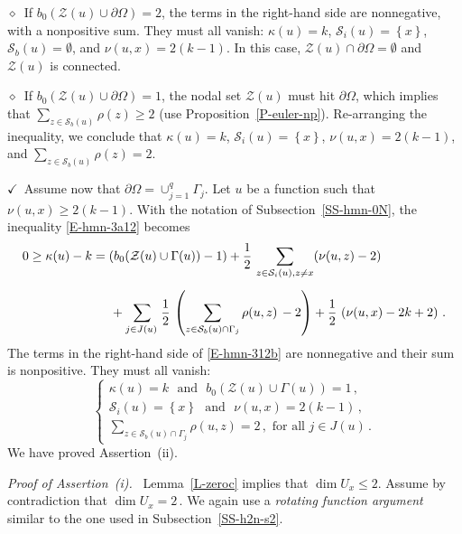 \documentclass[12pt,a4paper]{amsart}
\theoremstyle{plain} %
\theoremstyle{definition}
\numberwithin{equation}{section}
\numberwithin{figure}{section}
\numberwithin{table}{section}
\newcommand{\cS}{\mathcal{S}}
\newcommand{\cZ}{\mathcal{Z}}
\newcommand{\set}[1]{\left\lbrace #1 \right\rbrace}
\newcommand{\noid}{\noindent $\diamond$~}
\newcommand{\noih}{\noindent $\checkmark$~}
\begin{document}
\noid If $b_0(\cZ(u)\cup \partial\Omega) = 2$, the terms in the right-hand side are nonnegative, with a nonpositive sum. They must all vanish: $\kappa(u) = k$, $\cS_i(u) = \set{x}$, $\cS_b(u) = \emptyset$, and $\nu(u,x) = 2(k - 1)$. In this case, $\cZ(u) \cap \partial \Omega = \emptyset$ and $\cZ(u)$ is connected. \smallskip

\noid If $b_0(\cZ(u)\cup \partial\Omega) = 1$, the nodal set $\cZ(u)$ must hit $\partial \Omega$, which implies that $\sum_{z\in \cS_b(u) }\rho (z) \ge 2$ (use Proposition~\ref{P-euler-np}). Re-arranging the inequality, we conclude that $\kappa(u) = k$, $\cS_i(u) = \set{x}$, $\nu(u,x) = 2(k - 1)$, and $\sum_{z\in \cS_b(u) }\rho (z) = 2$. \medskip

\noih Assume now that $\partial \Omega = \cup_{j=1}^q \Gamma_j$. Let $u$ be a function such that $\nu(u,x) \ge 2(k - 1)$. With the notation of  Subsection~\ref{SS-hmn-0N}, the inequality \eqref{E-hmn-3a12} becomes
%
\begin{equation}\label{E-hmn-312b}
\begin{split}
0 \ge \kappa(u) - k &= \left( b_0(\cZ(u) \cup \Gamma(u)) - 1\right) + \frac 12\, \sum_{z \in \cS_i(u), z\not = x}(\nu(u,z) - 2) \\[5pt]
&\hspace{5mm} + \sum_{j \in J(u)\,}  \frac 12\,  \left(\sum_{z\in \cS_b(u) \cap \Gamma_j}\rho(u,z) \, - 2\right) + \frac 12\, \left( \nu(u,x) - 2k +2\right)\,.
\end{split}
\end{equation}
%
The terms in the right-hand side of \eqref{E-hmn-312b} are nonnegative and their sum is nonpositive. They must all vanish:
%
\begin{equation}\label{E-hmn-312c}
\left\{
\begin{array}{l}
\kappa(u) = k \text{~~and~~} b_0(\cZ(u) \cup \Gamma(u)) = 1\,,\\[5pt]
\cS_i(u) = \set{x} \text{~~and~~} \nu(u,x) = 2(k - 1)\,,\\[5pt]
\sum_{z\in \cS_b(u) \cap \Gamma_j}\rho(u,z) = 2\,, \text{~for all~} j \in J(u)\,.
\end{array}
\right.
\end{equation}
%
We have proved Assertion~(ii).\medskip

\emph{Proof of Assertion~(i).~} Lemma~\ref{L-zeroc} implies that $\dim U_x \le 2$. Assume by contradiction that $\dim U_x = 2\,$.  We again use a \emph{rotating function argument} similar to the one used in  Subsection~\ref{SS-h2n-s2}.\smallskip
\end{document}
